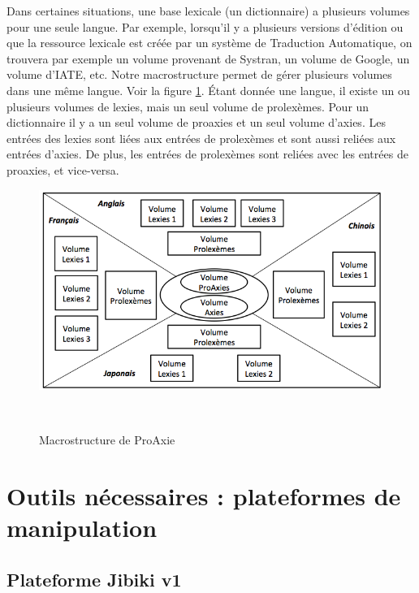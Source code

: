 \documentclass[10pt,a4paper,twoside]{article}
\begin{document}
Dans certaines situations, une base lexicale (un dictionnaire) a plusieurs volumes pour une seule langue. Par exemple, lorsqu'il y a plusieurs versions d’édition ou que la ressource lexicale est créée par un système de Traduction Automatique, on trouvera par exemple un volume provenant de Systran, un volume de Google, un volume d'IATE, etc. Notre macrostructure permet de gérer plusieurs volumes dans une même langue. Voir la figure \ref{image-macrostructure-proaxie}. Étant donnée une langue, il existe un ou plusieurs volumes de lexies, mais un seul volume de prolexèmes. Pour un dictionnaire il y a un seul volume de proaxies et un seul volume d'axies. Les entrées des lexies sont liées aux entrées de prolexèmes et sont aussi reliées aux entrées d'axies. De plus, les entrées de prolexèmes sont reliées avec les entrées de proaxies, et vice-versa.

\begin{figure}[htbp] 
\begin{center} 
\includegraphics[width=12cm]{images/proaxie.png}
\end{center} 
\caption{Macrostructure de ProAxie} \label{image-macrostructure-proaxie} \
\end{figure}

\section{Outils nécessaires : plateformes de manipulation}

\subsection{Plateforme Jibiki v1}
\end{document}
